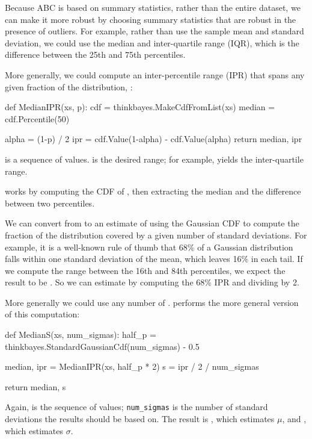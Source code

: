 \documentclass[12pt]{book}
\theoremstyle{exercise}
\begin{document}
Because ABC is based on summary statistics, rather than the entire
dataset, we can make it more robust by choosing summary statistics
that are robust in the presence of outliers.  For example, rather
than use the sample mean and standard deviation, we could use the median
and inter-quartile range
(IQR), which is the difference between the 25th and 75th percentiles.

More generally, we could compute an inter-percentile range (IPR) that
spans any given fraction of the distribution, :

\begin{code}
def MedianIPR(xs, p):
    cdf = thinkbayes.MakeCdfFromList(xs)
    median = cdf.Percentile(50)

    alpha = (1-p) / 2
    ipr = cdf.Value(1-alpha) - cdf.Value(alpha)
    return median, ipr
\end{code}

 is a sequence of values.   is the desired range;
for example,  yields the inter-quartile range.

 works by computing the CDF of ,
then extracting the median and the difference between two
percentiles.

We can convert from  to an estimate of  using the
Gaussian CDF to compute the fraction of the distribution covered by a
given number of standard deviations.  For example, it is a well-known
rule of thumb that 68\% of a Gaussian distribution falls within one
standard deviation of the mean, which leaves 16\% in each tail.  If we
compute the range between the 16th and 84th percentiles, we expect the
result to be .  So we can estimate  by
computing the 68\% IPR and dividing by 2.

More generally we could use any number of .
 performs the more general version of this
computation:

\begin{code}
def MedianS(xs, num_sigmas):
    half_p = thinkbayes.StandardGaussianCdf(num_sigmas) - 0.5

    median, ipr = MedianIPR(xs, half_p * 2)
    s = ipr / 2 / num_sigmas

    return median, s
\end{code}

Again,  is the sequence of values; \verb"num_sigmas" is the
number of standard deviations the results should be based on.  The
result is , which estimates $\mu$, and , which 
estimates $\sigma$.
\end{document}
